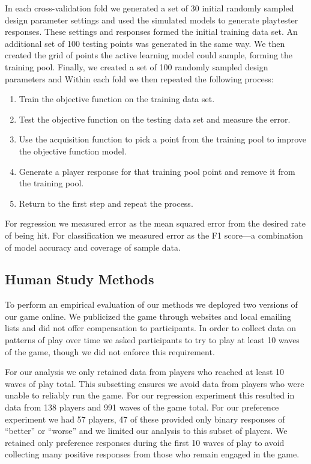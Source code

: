 \documentclass{sig-alternate}
\begin{document}
In each cross-validation fold we generated a set of 30 initial randomly sampled design parameter settings and used the simulated models to generate playtester responses.
These settings and responses formed the initial training data set.
An additional set of 100 testing points was generated in the same way.
We then created the grid of points the active learning model could sample, forming the training pool.
Finally, we created a set of 100 randomly sampled design parameters and 
Within each fold we then repeated the following process:
\begin{enumerate}
\item Train the objective function on the training data set.
\item Test the objective function on the testing data set and measure the error.
\item Use the acquisition function to pick a point from the training pool to improve the objective function model.
\item Generate a player response for that training pool point and remove it from the training pool.
\item Return to the first step and repeat the process.
\end{enumerate}
\noindent For regression we measured error as  the mean squared error from the desired rate of being hit.
For classification we measured error as the F1 score---a combination of model accuracy and coverage of sample data.


\subsection{Human Study Methods}

To perform an empirical evaluation of our methods we deployed two versions of our game online.
We publicized the game through websites and local emailing lists and did not offer compensation to participants.
In order to collect data on patterns of play over time we asked participants to try to play at least 10 waves of the game, though we did not enforce this requirement.

For our analysis we only retained data from players who reached at least 10 waves of play total. %
This subsetting ensures we avoid data from players who were unable to reliably run the game.
For our regression experiment this resulted in data from 138 players and 991 waves of the game total.
For our preference experiment we had 57 players, 47 of these provided only binary responses of ``better'' or ``worse'' and we limited our analysis to this subset of players.
We retained only preference responses during the first 10 waves of play to avoid collecting many positive responses from those who remain engaged in the game.
\end{document}
